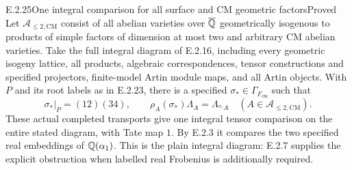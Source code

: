 \begin{result}{E.2.25}{One integral comparison for all surface and CM geometric factors}{Proved}
Let \(\mathcal A_{\leq2,\mathrm{CM}}\) consist of all
abelian varieties over \(\overline{\mathbb Q}\) geometrically isogenous to
products of simple factors of dimension at most two and
arbitrary CM abelian varieties. Take the full integral
diagram of E.2.16, including every geometric isogeny
lattice, all products, algebraic correspondences, tensor
constructions and specified projectors, finite-model
Artin module maps, and all Artin objects.
With \(P\) and its root labels as in E.2.23, there is a
specified \(\sigma_*\in\Gamma_{F_{\mathrm{cm}}}\) such that
\[
 \sigma_*|_P=(12)(34),\qquad
 \rho_A(\sigma_*)\Lambda_A
       =\Lambda_{{}^{\sigma_*}A}
       \quad(A\in\mathcal A_{\leq2,\mathrm{CM}}).
 \tag{E.2.25a}
\]
These actual completed transports give one integral
tensor comparison on the entire stated diagram, with
Tate map \(1\). By E.2.3 it compares the two specified
real embeddings of \(\mathbb Q(\alpha_1)\). This is the plain
integral diagram: E.2.7 supplies the explicit obstruction
when labelled real Frobenius is additionally required.
\end{result}
